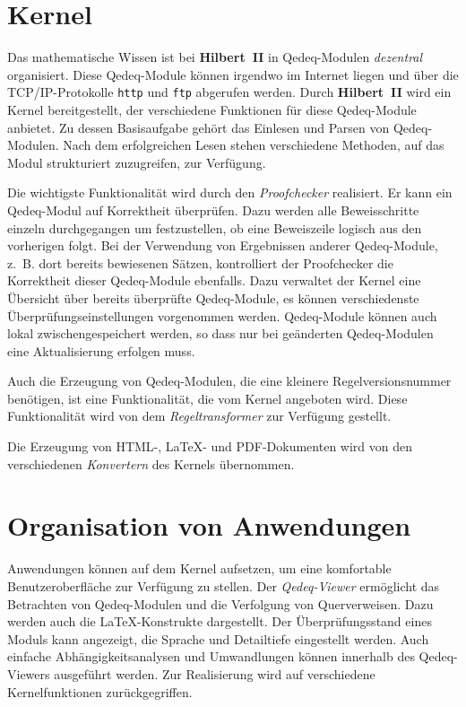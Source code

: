 \documentclass[a4paper,german,10pt,twoside]{book}
\begin{document}
{\section{Kernel}
Das mathematische Wissen ist bei \textbf{Hilbert~II} in Qedeq-Modulen \emph{dezentral} organisiert.
Diese Qedeq-Module k{\"o}nnen irgendwo im Internet liegen und {\"u}ber die TCP/IP-Protokolle {\tt http} und
{\tt ftp} abgerufen werden. Durch \textbf{Hilbert~II} wird ein Kernel bereitgestellt, der
verschiedene Funktionen f{\"u}r diese Qedeq-Module anbietet. Zu dessen Basisaufgabe geh{\"o}rt das Einlesen
und Parsen von Qedeq-Modulen. Nach dem erfolgreichen Lesen stehen verschiedene Methoden, auf das
Modul strukturiert zuzugreifen, zur Verf{\"u}gung.
\par
Die wichtigste Funktionalit{\"a}t wird durch den \emph{Proofchecker} realisiert. Er kann ein
Qedeq-Modul auf Korrektheit {\"u}berpr{\"u}fen. Dazu werden alle Beweisschritte einzeln durchgegangen um
festzustellen, ob eine Beweiszeile logisch aus den vorherigen folgt. Bei der Verwendung von
Ergebnissen anderer Qedeq-Module, z.~B. dort bereits bewiesenen S{\"a}tzen, kontrolliert der
Proofchecker die Korrektheit dieser Qedeq-Module ebenfalls. Dazu verwaltet der Kernel eine
{\"U}bersicht {\"u}ber bereits {\"u}berpr{\"u}fte Qedeq-Module, es k{\"o}nnen verschiedenste {\"U}berpr{\"u}fungseinstellungen
vorgenommen werden. Qedeq-Module k{\"o}nnen auch lokal zwischengespeichert werden, so dass nur bei
ge{\"a}nderten Qedeq-Modulen eine Aktualisierung erfolgen muss.
\par
Auch die Erzeugung von Qedeq-Modulen, die eine kleinere Regelversionsnummer
ben{\"o}tigen, ist eine Funktionalit{\"a}t, die vom Kernel angeboten wird. Diese Funktionalit{\"a}t wird von
dem \emph{Regeltransformer} zur Verf{\"u}gung gestellt.
\par
Die Erzeugung von HTML-, \LaTeX{}- und PDF-Dokumenten wird von den verschiedenen
\emph{Konvertern} des Kernels {\"u}bernommen.

\section{Organisation von Anwendungen}
Anwendungen k{\"o}nnen auf dem Kernel aufsetzen, um eine komfortable Benutzeroberfl{\"a}che zur Verf{\"u}gung
zu stellen. Der \emph{Qedeq-Viewer} erm{\"o}glicht das Betrachten von
Qedeq-Modulen und die Verfolgung von Querverweisen. Dazu werden auch die \LaTeX{}-Konstrukte
dargestellt. Der {\"U}berpr{\"u}fungsstand eines Moduls kann angezeigt, die Sprache und Detailtiefe
eingestellt werden. Auch einfache Abh{\"a}ngigkeitsanalysen und Umwandlungen k{\"o}nnen innerhalb des
Qedeq-Viewers ausgef{\"u}hrt werden. Zur Realisierung wird auf verschiedene Kernelfunktionen
zur{\"u}ckgegriffen.

}
\end{document}
